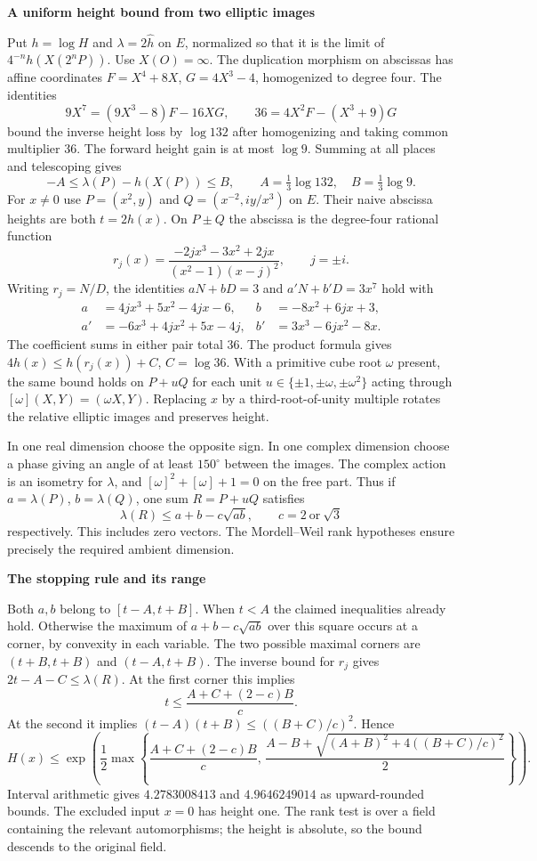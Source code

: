 \documentclass[12pt]{article}
\newcommand{\heading}[1]{{\Large\bfseries\color{ink}#1}\par\smallskip}
\begin{document}
\newpage
\heading{A uniform height bound from two elliptic images}
Put $h=\log H$ and $\lambda=2\widehat h$ on $E$, normalized so that it is the limit of $4^{-n}h(X(2^nP))$. Use $X(O)=\infty$. The duplication morphism on abscissas has affine coordinates $F=X^4+8X$, $G=4X^3-4$, homogenized to degree four. The identities
\[
9X^7=(9X^3-8)F-16XG,\qquad 36=4X^2F-(X^3+9)G
\]
bound the inverse height loss by $\log132$ after homogenizing and taking common multiplier 36. The forward height gain is at most $\log9$. Summing at all places and telescoping gives
\[
       -A\le\lambda(P)-h(X(P))\le B,\qquad
       A=\tfrac13\log132,\quad B=\tfrac13\log9 .
\]
For $x\ne0$ use $P=(x^2,y)$ and $Q=(x^{-2},iy/x^3)$ on $E$. Their naive abscissa heights are both $t=2h(x)$. On $P\pm Q$ the abscissa is the degree-four rational function
\[
 r_j(x)=\frac{-2jx^3-3x^2+2jx}{(x^2-1)(x-j)^2},\qquad j=\pm i .
\]
Writing $r_j=N/D$, the identities $aN+bD=3$ and $a'N+b'D=3x^7$ hold with
\[
\begin{aligned}
a&=4jx^3+5x^2-4jx-6,& b&=-8x^2+6jx+3,\\
a'&=-6x^3+4jx^2+5x-4j,&b'&=3x^3-6jx^2-8x .
\end{aligned}
\]
The coefficient sums in either pair total 36. The product formula gives $4h(x)\le h(r_j(x))+C$, $C=\log36$. With a primitive cube root $\omega$ present, the same bound holds on $P+uQ$ for each unit $u\in\{\pm1,\pm\omega,\pm\omega^2\}$ acting through $[\omega](X,Y)=(\omega X,Y)$. Replacing $x$ by a third-root-of-unity multiple rotates the relative elliptic images and preserves height.

In one real dimension choose the opposite sign. In one complex dimension choose a phase giving an angle of at least $150^\circ$ between the images. The complex action is an isometry for $\lambda$, and $[\omega]^2+[\omega]+1=0$ on the free part. Thus if $a=\lambda(P)$, $b=\lambda(Q)$, one sum $R=P+uQ$ satisfies
\[
 \lambda(R)\le a+b-c\sqrt{ab},\qquad
 c=2\ \text{or}\ \sqrt3
\]
respectively. This includes zero vectors. The Mordell--Weil rank hypotheses ensure precisely the required ambient dimension.

\newpage
\heading{The stopping rule and its range}
Both $a,b$ belong to $[t-A,t+B]$. When $t<A$ the claimed inequalities already hold. Otherwise the maximum of $a+b-c\sqrt{ab}$ over this square occurs at a corner, by convexity in each variable. The two possible maximal corners are $(t+B,t+B)$ and $(t-A,t+B)$. The inverse bound for $r_j$ gives $2t-A-C\le\lambda(R)$. At the first corner this implies
\[
 t\le \frac{A+C+(2-c)B}{c}.
\]
At the second it implies $(t-A)(t+B)\le ((B+C)/c)^2$. Hence
\[
 H(x)\le\exp\!\left(\frac12\max\!\left\{
 \frac{A+C+(2-c)B}{c},\,
 \frac{A-B+\sqrt{(A+B)^2+4((B+C)/c)^2}}{2}
 \right\}\right).
\]
Interval arithmetic gives $4.2783008413$ and $4.9646249014$ as upward-rounded bounds. The excluded input $x=0$ has height one. The rank test is over a field containing the relevant automorphisms; the height is absolute, so the bound descends to the original field.
\end{document}
